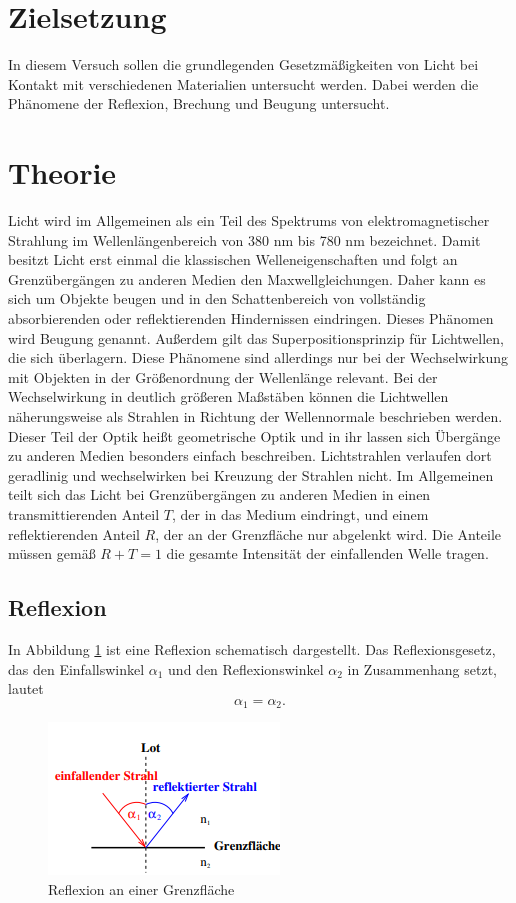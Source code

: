 \section{Zielsetzung}
\noindent In diesem Versuch sollen die grundlegenden Gesetzmäßigkeiten von Licht bei Kontakt mit verschiedenen
Materialien untersucht werden. Dabei werden die Phänomene der Reflexion, Brechung und Beugung untersucht.
\section{Theorie}
\label{sec:Theorie}
\noindent Licht wird im Allgemeinen als ein Teil des Spektrums von elektromagnetischer Strahlung im Wellenlängenbereich
von 380 nm bis 780 nm bezeichnet. Damit besitzt Licht erst einmal die klassischen Welleneigenschaften und folgt an Grenzübergängen
zu anderen Medien den Maxwellgleichungen. Daher kann es sich um Objekte
beugen und in den Schattenbereich von vollständig absorbierenden oder reflektierenden Hindernissen eindringen. Dieses Phänomen wird Beugung
genannt. Außerdem gilt das Superpositionsprinzip für Lichtwellen, die sich überlagern. Diese Phänomene sind allerdings nur bei
der Wechselwirkung mit Objekten in der Größenordnung der Wellenlänge relevant. Bei der Wechselwirkung in deutlich größeren Maßstäben
können die Lichtwellen näherungsweise als Strahlen in Richtung der Wellennormale beschrieben werden. Dieser Teil der Optik heißt geometrische Optik
und in ihr lassen sich Übergänge zu anderen Medien besonders einfach beschreiben. Lichtstrahlen verlaufen dort geradlinig und wechselwirken bei Kreuzung der Strahlen nicht.
Im Allgemeinen teilt sich das Licht bei 
Grenzübergängen zu anderen Medien in einen transmittierenden Anteil $T$, der in das Medium eindringt, und einem reflektierenden
Anteil $R$, der an der Grenzfläche nur abgelenkt wird. Die Anteile müssen gemäß $R+T=1$ die gesamte Intensität der einfallenden Welle 
tragen.
\subsection{Reflexion}
In Abbildung \ref{fig:Ref} ist eine Reflexion schematisch dargestellt.
Das Reflexionsgesetz, das den Einfallswinkel $\alpha_1$ und den Reflexionswinkel $\alpha_2$ in Zusammenhang
setzt, lautet
\begin{equation}
    \alpha_1=\alpha_2.
    \label{eq:Reflexion}
\end{equation}
\begin{figure}
    \centering
    \includegraphics{content/Reflexion.png}
    \caption{Reflexion an einer Grenzfläche\cite{V400}}
    \label{fig:Ref}
\end{figure}
